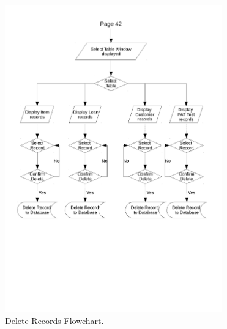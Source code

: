 \begin{figure}[H]
    \begin{center}
        \includegraphics[width=355px]{./Design/system_flowcharts/PDFs/delete_records_flowchart.pdf}
    \end{center}
    \caption{Delete Records Flowchart.} \label{fig:print_function_result}
\end{figure}

